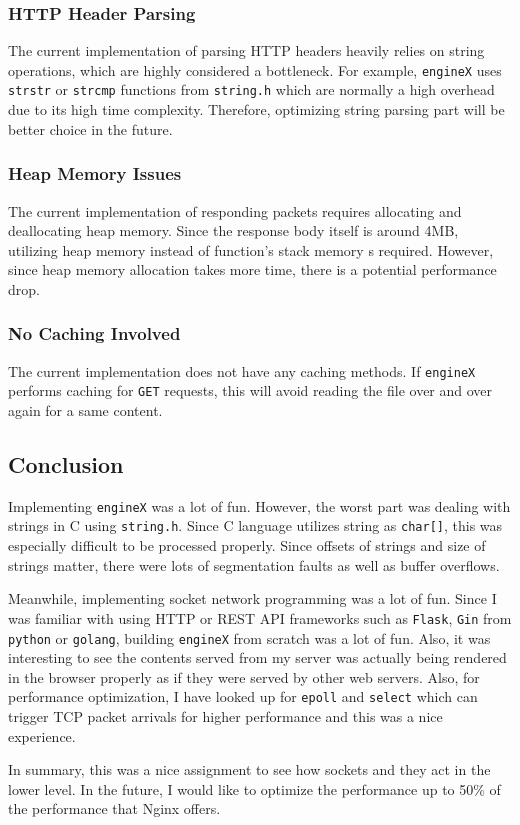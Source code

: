 \documentclass{homework}
\begin{document}
\subsubsection{HTTP Header Parsing}
The current implementation of parsing HTTP headers heavily relies on string operations, which are highly considered a bottleneck. For example, \texttt{engineX} uses \texttt{strstr} or \texttt{strcmp} functions from \texttt{string.h} which are normally a high overhead due to its high time complexity. Therefore, optimizing string parsing part will be better choice in the future.

\subsubsection{Heap Memory Issues}
The current implementation of responding packets requires allocating and deallocating heap memory. Since the response body itself is around 4MB, utilizing heap memory instead of function's stack memory s required. However, since heap memory allocation takes more time, there is a potential performance drop.

\subsubsection{No Caching Involved}
The current implementation does not have any caching methods. If \texttt{engineX} performs caching for \texttt{GET} requests, this will avoid reading the file over and over again for a same content.

\subsection{Conclusion}
Implementing \texttt{engineX} was a lot of fun. However, the worst part was dealing with strings in C using \texttt{string.h}. Since C language utilizes string as \texttt{char[]}, this was especially difficult to be processed properly. Since offsets of strings and size of strings matter, there were lots of segmentation faults as well as buffer overflows. 

Meanwhile, implementing socket network programming was a lot of fun. Since I was familiar with using HTTP or REST API frameworks such as \texttt{Flask}, \texttt{Gin} from \texttt{python} or \texttt{golang}, building \texttt{engineX} from scratch was a lot of fun. Also, it was interesting to see the contents served from my server was actually being rendered in the browser properly as if they were served by other web servers. Also, for performance optimization, I have looked up for \texttt{epoll} and \texttt{select} which can trigger TCP packet arrivals for higher performance and this was a nice experience.

In summary, this was a nice assignment to see how sockets and they act in the lower level. In the future, I would like to optimize the performance up to 50\% of the performance that Nginx offers.
\end{document}
